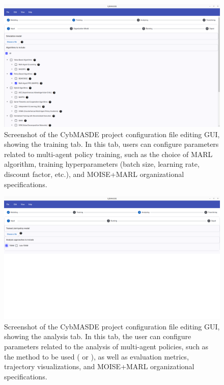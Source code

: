 \begin{figure}[h!]
       \centering

       \includegraphics[width=\linewidth]{figures/training_screenshot.png}
       \caption[Screenshot of the training tab of the CybMASDE GUI]{Screenshot of the CybMASDE project configuration file editing GUI, showing the training tab. In this tab, users can configure parameters related to multi-agent policy training, such as the choice of MARL algorithm, training hyperparameters (batch size, learning rate, discount factor, etc.), and MOISE+MARL organizational specifications.}
       \label{fig:cybmasde_screenshot_training}
\end{figure}
\begin{figure}[h!]
       \centering
       \includegraphics[width=\linewidth]{figures/analyzing_screenshot.png}
       \caption[Screenshot of the analysis tab of the CybMASDE GUI]{Screenshot of the CybMASDE project configuration file editing GUI, showing the analysis tab. In this tab, the user can configure parameters related to the analysis of multi-agent policies, such as the method to be used ( or ), as well as evaluation metrics, trajectory visualizations, and MOISE+MARL organizational specifications.}
       \label{fig:cybmasde_screenshot_analyzing}
\end{figure}
